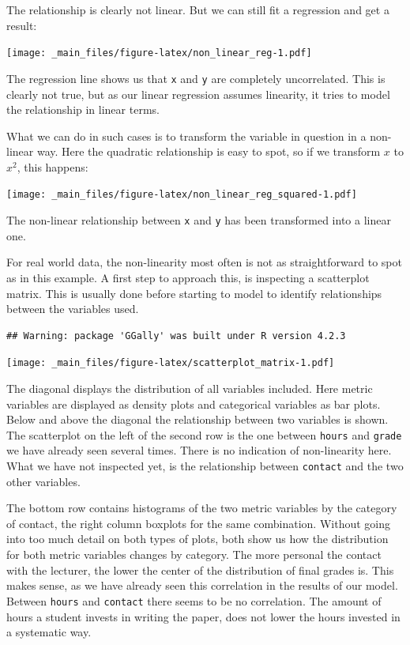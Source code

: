 \documentclass[
]{book}
\begin{document}
The relationship is clearly not linear. But we can still fit a regression and get a result:

\texttt{[image: \_main\_files/figure-latex/non\_linear\_reg-1.pdf]}

The regression line shows us that \texttt{x} and \texttt{y} are completely uncorrelated. This is clearly not true, but as our linear regression assumes linearity, it tries to model the relationship in linear terms.

What we can do in such cases is to transform the variable in question in a non-linear way. Here the quadratic relationship is easy to spot, so if we transform \(x\) to \(x^2\), this happens:

\texttt{[image: \_main\_files/figure-latex/non\_linear\_reg\_squared-1.pdf]}

The non-linear relationship between \texttt{x} and \texttt{y} has been transformed into a linear one.

For real world data, the non-linearity most often is not as straightforward to spot as in this example. A first step to approach this, is inspecting a scatterplot matrix. This is usually done before starting to model to identify relationships between the variables used.

\begin{verbatim}
## Warning: package 'GGally' was built under R version 4.2.3
\end{verbatim}

\texttt{[image: \_main\_files/figure-latex/scatterplot\_matrix-1.pdf]}

The diagonal displays the distribution of all variables included. Here metric variables are displayed as density plots and categorical variables as bar plots. Below and above the diagonal the relationship between two variables is shown. The scatterplot on the left of the second row is the one between \texttt{hours} and \texttt{grade} we have already seen several times. There is no indication of non-linearity here. What we have not inspected yet, is the relationship between \texttt{contact} and the two other variables.

The bottom row contains histograms of the two metric variables by the category of contact, the right column boxplots for the same combination. Without going into too much detail on both types of plots, both show us how the distribution for both metric variables changes by category. The more personal the contact with the lecturer, the lower the center of the distribution of final grades is. This makes sense, as we have already seen this correlation in the results of our model. Between \texttt{hours} and \texttt{contact} there seems to be no correlation. The amount of hours a student invests in writing the paper, does not lower the hours invested in a systematic way.
\end{document}
